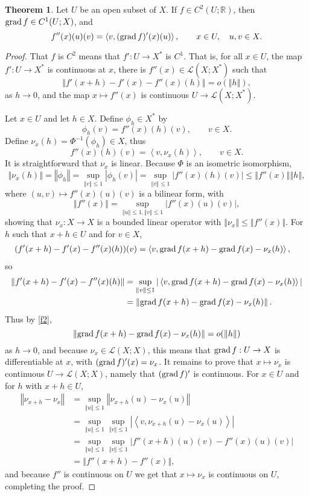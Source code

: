 \documentclass{article}
\newcommand{\inner}[2]{\left\langle #1, #2 \right\rangle}
\newcommand{\grad}{\ensuremath\mathrm{grad}\,}
\newcommand{\norm}[1]{\left\Vert #1 \right\Vert}
\theoremstyle{definition}
\newtheorem{theorem}{Theorem}
\theoremstyle{definition}
\begin{document}
\begin{theorem}
Let $U$ be an open subset of $X$. If $f \in C^2(U;\mathbb{R})$, then $\grad  f \in C^1(U;X)$, and
\begin{equation}
f''(x)(u)(v) = \inner{v}{(\grad f)'(x)(u)},\qquad x \in U, \quad u,v \in X.
\label{hessian}
\end{equation}
\end{theorem}
\begin{proof}
That $f$ is $C^2$ means that $f':U \to X^*$ is $C^1$. That is, for all $x \in U$, 
the map $f':U \to X^*$ is continuous at $x$, there is 
$f''(x) \in \mathscr{L}(X;X^*)$ such that
\begin{equation}
\norm{f'(x+h)-f'(x)-f''(x)(h)} = o(\norm{h}),
\label{f2}
\end{equation}
as $h \to 0$, and the map $x \mapsto f''(x)$ is continuous 
$U \to \mathscr{L}(X;X^*)$. 

Let $x \in U$ and let $h \in X$.
Define $\phi_h \in X^*$ by
\[
\phi_h(v) = f''(x)(h)(v), \qquad v \in X.
\]
Define $\nu_x(h) = \Phi^{-1}(\phi_h) \in X$,
thus
\[
f''(x)(h)(v) = \inner{v}{\nu_x(h)}, \qquad v \in X.
\]
It is straightforward that $\nu_x$ is linear. Because $\Phi$ is an isometric isomorphism,
\[
\norm{\nu_x(h)}=\norm{\phi_h}
=\sup_{\norm{v} \leq 1} |\phi_h(v)|
=\sup_{\norm{v} \leq 1} |f''(x)(h)(v)|
\leq \norm{f''(x)} \norm{h},
\]
where $(u,v) \mapsto f''(x)(u)(v)$ is a bilinear form, with
\[
\norm{f''(x)} = \sup_{\norm{u} \leq 1, \norm{v} \leq 1} |f''(x)(u)(v)|,
\]
showing that $\nu_x:X \to X$ is a bounded linear operator with $\norm{\nu_x} \leq \norm{f''(x)}$. 
For $h$ such that $x+h \in U$ and for $v \in X$,
\begin{align*}
(f'(x+h)-f'(x)-f''(x)(h))(v)&=\inner{v}{\grad f(x+h) - \grad f(x)-\nu_x(h)},
\end{align*}
so
\begin{align*}
\norm{f'(x+h)-f'(x)-f''(x)(h)}&=\sup_{\norm{v} \leq 1} 
|\inner{v}{\grad f(x+h) - \grad f(x)-\nu_x(h)}|\\
&= \norm{\grad f(x+h)-\grad f(x) - \nu_x(h)}.
\end{align*}
Thus by \eqref{f2}, 
\[
\norm{\grad f(x+h)-\grad f(x) - \nu_x(h)}=o(\norm{h})
\]
as $h \to 0$, and because $\nu_x \in \mathscr{L}(X;X)$, this means that
$\grad f:U \to X$ is differentiable at $x$, with
$(\grad f)'(x) = \nu_x$. 
It remains to prove that $x \mapsto \nu_x$ is continuous
$U \to \mathscr{L}(X;X)$, namely that $(\grad f)'$ is continuous. 
For $x \in U$ and for $h$ with $x+h \in U$,
\begin{align*}
\norm{\nu_{x+h}-\nu_x} &= \sup_{\norm{u} \leq 1} \norm{\nu_{x+h}(u)-\nu_x(u)}\\
&=\sup_{\norm{u} \leq 1} \sup_{\norm{v} \leq 1} |\inner{v}{\nu_{x+h}(u)-\nu_x(u)}|\\
&=\sup_{\norm{u} \leq 1} \sup_{\norm{v} \leq 1} |f''(x+h)(u)(v)-f''(x)(u)(v)|\\
&=\norm{f''(x+h)-f''(x)},
\end{align*}
and because $f''$ is continuous on $U$ we get that $x \mapsto \nu_x$ is continuous on $U$, completing
the proof.
\end{proof}
\end{document}
